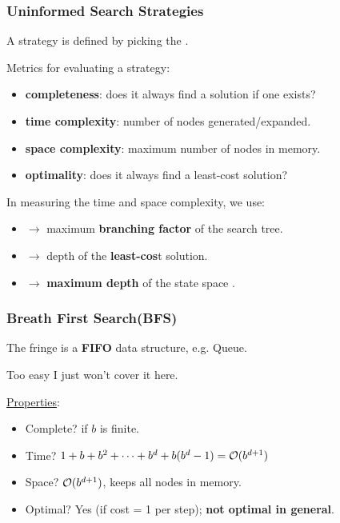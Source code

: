 \documentclass{ainote}
\begin{document}

\subsubsection{Uninformed Search Strategies}
A strategy is defined by picking the .

Metrics for evaluating a strategy:
\begin{itemize}
    \item \textbf{completeness}: does it always find a solution if one exists?
    \item \textbf{time complexity}: number of nodes generated/expanded.
    \item \textbf{space complexity}: maximum number of nodes in memory.
    \item \textbf{optimality}: does it always find a least-cost solution?
\end{itemize}

In measuring the time and space complexity, we use:
\begin{itemize}
    \item {} $\longrightarrow$ maximum \textbf{branching factor} of the search tree.
    \item {} $\longrightarrow$ depth of the \textbf{least-cos}t solution.
    \item {} $\longrightarrow$ \textbf{maximum depth} of the state space .
\end{itemize}


\subsubsection{Breath First Search(BFS)}
The fringe is a \textbf{FIFO} data structure, e.g. Queue.

Too easy I just won't cover it here.

\underline{Properties}:
\begin{itemize}
    \item Complete?  if $b$ is finite. 
    \item Time? $1+b+b^2+\dots+b^d+b(b^d-1)=\mathcal{O}(b^{d+1})$

    \item Space? $\mathcal{O}(b^{d+1})$, keeps all nodes in memory.
    \item Optimal? Yes (if cost = 1 per step); \textbf{not optimal in general}.
\end{itemize}
\end{document}
